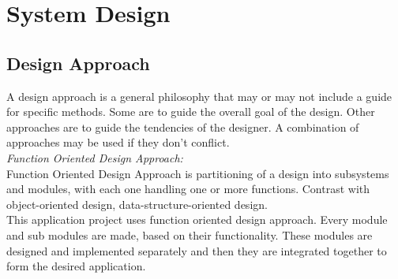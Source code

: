 \chapter{System Design}

\section{Design Approach}
A design approach is a general philosophy that may or may not include a guide for specific methods. Some are to guide the overall goal of the design. Other approaches are to guide the tendencies of the designer. A combination of approaches may be used if they don't conflict.\\
\emph{Function Oriented Design Approach:}\\
Function Oriented Design Approach is partitioning of a design into subsystems and modules, with each one handling one or more functions. Contrast with object-oriented design, data-structure-oriented design. \\

This application project uses function oriented design approach. Every module and sub modules are made, based on their functionality.
These modules are designed and implemented separately and then they are integrated together to form the desired application.

